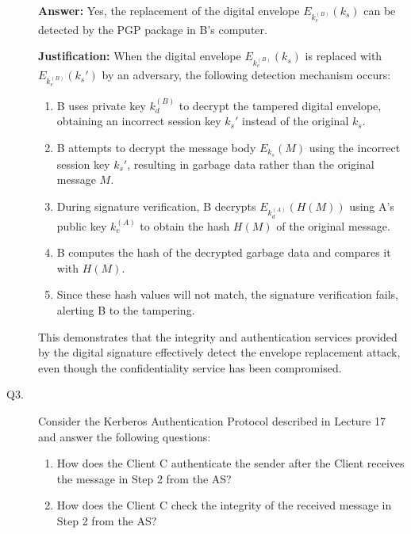 \documentclass[11pt]{article}
\begin{document}
\begin{description}
\textbf{Answer:}
    Yes, the replacement of the digital envelope $E_{k_e^{(B)}}(k_s)$ can be detected by the PGP package in B's computer.
    
    \textbf{Justification:}
    When the digital envelope $E_{k_e^{(B)}}(k_s)$ is replaced with $E_{k_e^{(B)}}(k_s')$ by an adversary, the following detection mechanism occurs:
    
    \begin{enumerate}
        \item B uses private key $k_d^{(B)}$ to decrypt the tampered digital envelope, obtaining an incorrect session key $k_s'$ instead of the original $k_s$.
        
        \item B attempts to decrypt the message body $E_{k_s}(M)$ using the incorrect session key $k_s'$, resulting in garbage data rather than the original message $M$.
        
        \item During signature verification, B decrypts $E_{k_d^{(A)}}(H(M))$ using A's public key $k_e^{(A)}$ to obtain the hash $H(M)$ of the original message.
        
        \item B computes the hash of the decrypted garbage data and compares it with $H(M)$.
        
        \item Since these hash values will not match, the signature verification fails, alerting B to the tampering.
    \end{enumerate}
    
    This demonstrates that the integrity and authentication services provided by the digital signature effectively detect the envelope replacement attack, even though the confidentiality service has been compromised.




\item[Q3.] 
Consider the Kerberos Authentication Protocol described in Lecture 17 
and answer the following questions:   
\begin{enumerate} 
\item How does the Client C authenticate the sender after the Client receives the message in Step 2 from the AS?  \hfill {} 

\item How does the Client C check the integrity of the received message in Step 2 from the AS? \hfill {} 


\end{enumerate}
\end{description}
\end{document}
